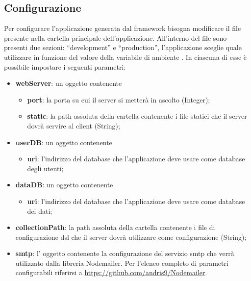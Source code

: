 \subsection{Configurazione}
\label{config}

Per configurare l'applicazione generata dal framework bisogna modificare il file  presente nella cartella principale dell'applicazione. All'interno del file sono presenti due sezioni: ``development'' e ``production'', l'applicazione sceglie quale utilizzare in funzione del valore della variabile di ambiente . In ciascuna di esse è possibile impostare i seguenti parametri:

\begin{itemize}
\item \textbf{webServer}: un oggetto contenente
		\begin{itemize}
		\item \textbf{port}: la porta su cui il server si metterà in ascolto (Integer);
		\item \textbf{static}: la path assoluta della cartella contenente i file statici che il server dovrà servire al client (String);
		\end{itemize}
		
\item \textbf{userDB}: un oggetto contenente
		\begin{itemize}
		\item \textbf{uri}: l'indirizzo del database che l'applicazione deve usare come database degli utenti;
		\end{itemize}
		
\item \textbf{dataDB}: un oggetto contenente
		\begin{itemize}
		\item \textbf{uri}: l'indirizzo del database che l'applicazione deve usare come database dei dati;
		\end{itemize}
		
\item \textbf{collectionPath}: la path assoluta della cartella contenente i file di configurazione dsl che il server dovrà utilizzare come configurazione (String);
		
\item \textbf{smtp}: l' oggetto contenente la configurazione del servizio smtp che verrà utilizzato dalla libreria Nodemailer. Per l'elenco completo di parametri configurabili riferirsi a \url{https://github.com/andris9/Nodemailer}.
\end{itemize}

